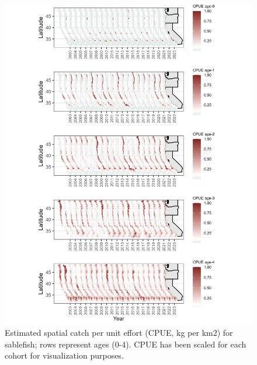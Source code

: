 \documentclass[
]{article}
\begin{document}
\newpage

\begin{figure}

{\centering \includegraphics[width=6.2in,height=\textheight]{plots/sablefish-age-class-year.png}

}

\caption{\label{fig-sablefish-spatial-composition-all}Estimated spatial
catch per unit effort (CPUE, kg per km2) for sablefish; rows represent
ages (0-4). CPUE has been scaled for each cohort for visualization
purposes.}

\end{figure}

\newpage
\end{document}
